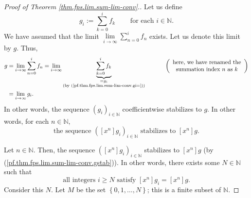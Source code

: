 \begin{fineprint}
\begin{proof}
[Proof of Theorem \ref{thm.fps.lim.sum-lim-conv}.]Let us define%
\begin{equation}
g_{i}:=\sum_{k=0}^{i}f_{k}\ \ \ \ \ \ \ \ \ \ \text{for each }i\in\mathbb{N}.
\label{pf.thm.fps.lim.sum-lim-conv.gi=}%
\end{equation}
We have assumed that the limit $\lim\limits_{i\rightarrow\infty}\sum_{n=0}%
^{i}f_{n}$ exists. Let us denote this limit by $g$. Thus,%
\begin{align}
g  &  =\lim\limits_{i\rightarrow\infty}\sum_{n=0}^{i}f_{n}=\lim
\limits_{i\rightarrow\infty}\underbrace{\sum_{k=0}^{i}f_{k}}_{\substack{=g_{i}%
\\\text{(by (\ref{pf.thm.fps.lim.sum-lim-conv.gi=}))}}%
}\ \ \ \ \ \ \ \ \ \ \left(
\begin{array}
[c]{c}%
\text{here, we have renamed the}\\
\text{summation index }n\text{ as }k
\end{array}
\right) \nonumber\\
&  =\lim\limits_{i\rightarrow\infty}g_{i}.
\label{pf.thm.fps.lim.sum-lim-conv.g=lim}%
\end{align}
In other words, the sequence $\left(  g_{i}\right)  _{i\in\mathbb{N}}$
coefficientwise stabilizes to $g$. In other words, for each $n\in\mathbb{N}$,%
\begin{equation}
\text{the sequence }\left(  \left[  x^{n}\right]  g_{i}\right)  _{i\in
\mathbb{N}}\text{ stabilizes to }\left[  x^{n}\right]  g.
\label{pf.thm.fps.lim.sum-lim-conv.gstab}%
\end{equation}


Let $n\in\mathbb{N}$. Then, the sequence $\left(  \left[  x^{n}\right]
g_{i}\right)  _{i\in\mathbb{N}}$ stabilizes to $\left[  x^{n}\right]  g$ (by
(\ref{pf.thm.fps.lim.sum-lim-conv.gstab})). In other words, there exists some
$N\in\mathbb{N}$ such that
\begin{equation}
\text{all integers }i\geq N\text{ satisfy }\left[  x^{n}\right]  g_{i}=\left[
x^{n}\right]  g. \label{pf.thm.fps.lim.sum-lim-conv.1}%
\end{equation}
Consider this $N$. Let $M$ be the set $\left\{  0,1,\ldots,N\right\}  $; this
is a finite subset of $\mathbb{N}$.


\end{proof}
\end{fineprint}
